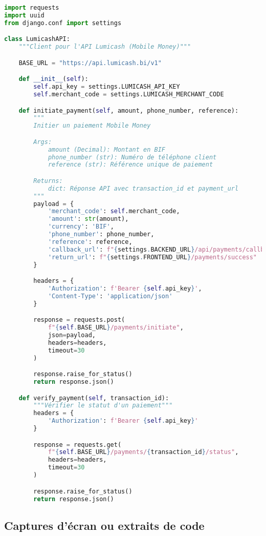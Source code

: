 \begin{lstlisting}[language=Python, caption=payments/lumicash.py]
import requests
import uuid
from django.conf import settings

class LumicashAPI:
    """Client pour l'API Lumicash (Mobile Money)"""

    BASE_URL = "https://api.lumicash.bi/v1"

    def __init__(self):
        self.api_key = settings.LUMICASH_API_KEY
        self.merchant_code = settings.LUMICASH_MERCHANT_CODE

    def initiate_payment(self, amount, phone_number, reference):
        """
        Initier un paiement Mobile Money

        Args:
            amount (Decimal): Montant en BIF
            phone_number (str): Numéro de téléphone client
            reference (str): Référence unique de paiement

        Returns:
            dict: Réponse API avec transaction_id et payment_url
        """
        payload = {
            'merchant_code': self.merchant_code,
            'amount': str(amount),
            'currency': 'BIF',
            'phone_number': phone_number,
            'reference': reference,
            'callback_url': f"{settings.BACKEND_URL}/api/payments/callback/",
            'return_url': f"{settings.FRONTEND_URL}/payments/success"
        }

        headers = {
            'Authorization': f'Bearer {self.api_key}',
            'Content-Type': 'application/json'
        }

        response = requests.post(
            f"{self.BASE_URL}/payments/initiate",
            json=payload,
            headers=headers,
            timeout=30
        )

        response.raise_for_status()
        return response.json()

    def verify_payment(self, transaction_id):
        """Vérifier le statut d'un paiement"""
        headers = {
            'Authorization': f'Bearer {self.api_key}'
        }

        response = requests.get(
            f"{self.BASE_URL}/payments/{transaction_id}/status",
            headers=headers,
            timeout=30
        )

        response.raise_for_status()
        return response.json()
\end{lstlisting}

\subsection{Captures d'écran ou extraits de code}

